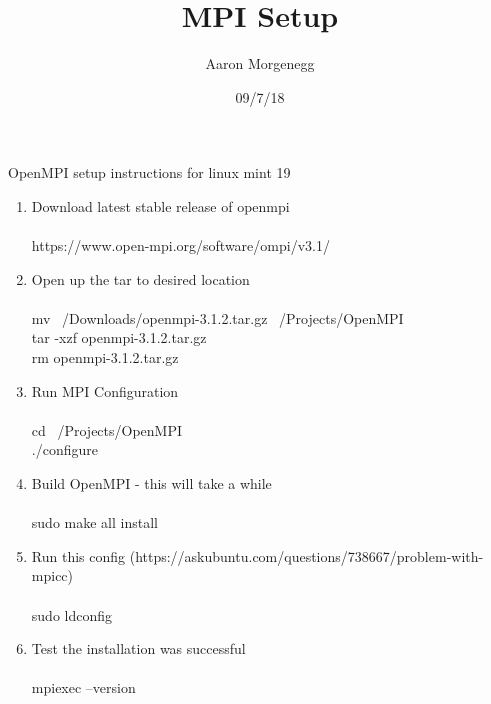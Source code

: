 \documentclass[12pt]{article}
\title{MPI Setup}
\author{Aaron Morgenegg}
\date{09/7/18}
\begin{document}
\maketitle

OpenMPI setup instructions for linux mint 19


\begin{enumerate}
  \item Download latest stable release of openmpi \\ \\
  \indent https://www.open-mpi.org/software/ompi/v3.1/
  \item Open up the tar to desired location \\ \\
  \indent mv ~/Downloads/openmpi-3.1.2.tar.gz ~/Projects/OpenMPI \\
  \indent tar -xzf openmpi-3.1.2.tar.gz \\
  \indent rm openmpi-3.1.2.tar.gz \\
  \item Run MPI Configuration \\ \\
  \indent cd ~/Projects/OpenMPI \\
  \indent ./configure \\
  \item Build OpenMPI - this will take a while \\ \\
  \indent sudo make all install \\
  \item Run this config (https://askubuntu.com/questions/738667/problem-with-mpicc) \\ \\
  \indent sudo ldconfig
  \item Test the installation was successful \\ \\
  \indent mpiexec --version

\end{enumerate}
\end{document}
